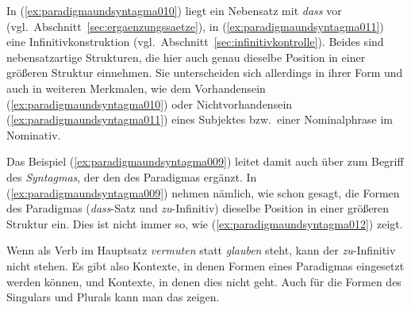 \begin{exe}
  \ex\label{ex:paradigmaundsyntagma009}
  \begin{xlist}
  \end{xlist}
\end{exe}

In (\ref{ex:paradigmaundsyntagma010}) liegt ein Nebensatz mit \textit{dass} vor (vgl.\ Abschnitt~\ref{sec:ergaenzungssaetze}), in (\ref{ex:paradigmaundsyntagma011}) eine Infinitivkonstruktion (vgl.\ Abschnitt~\ref{sec:infinitivkontrolle}).
Beides sind nebensatzartige Strukturen, die hier auch genau dieselbe Position in einer größeren Struktur einnehmen.
Sie unterscheiden sich allerdings in ihrer Form und auch in weiteren Merkmalen, wie \zB dem Vorhandensein (\ref{ex:paradigmaundsyntagma010}) oder Nichtvorhandensein (\ref{ex:paradigmaundsyntagma011}) eines Subjektes bzw.\ einer Nominalphrase im Nominativ.

Das Beispiel (\ref{ex:paradigmaundsyntagma009}) leitet damit auch über zum Begriff des \textit{Syntagmas}, der den des Paradigmas ergänzt.
In (\ref{ex:paradigmaundsyntagma009}) nehmen nämlich, wie schon gesagt, die Formen des Paradigmas (\textit{dass}-Satz und \textit{zu}-Infinitiv) dieselbe Position in einer größeren Struktur ein.
Dies ist nicht immer so, wie (\ref{ex:paradigmaundsyntagma012}) zeigt.

\begin{exe}
  \ex\label{ex:paradigmaundsyntagma012}
  \begin{xlist}
  \end{xlist}
\end{exe}

Wenn als Verb im Hauptsatz \textit{vermuten} statt \textit{glauben} steht, kann der \textit{zu}-Infinitiv nicht stehen.
Es gibt also Kontexte, in denen Formen eines Paradigmas eingesetzt werden können, und Kontexte, in denen dies nicht geht.
Auch für die Formen des Singulars und Plurals kann man das zeigen.


\begin{exe}
  \ex\label{ex:paradigmaundsyntagma015}
  \begin{xlist}
  \end{xlist}
\end{exe}


